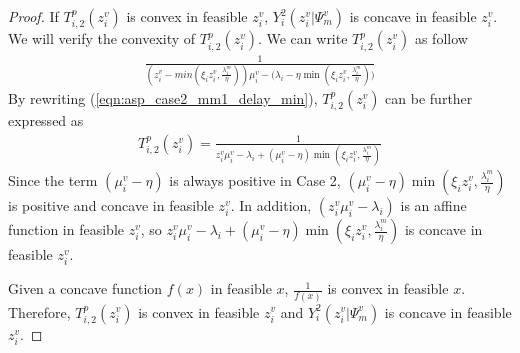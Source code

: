 \documentclass[conference]{IEEEtran}
\begin{document}
\begin{proof}
If $T_{i,2}^p(z_i^v)$ is convex in feasible $z_i^v$, $Y_i^2(z_i^v|\Psi_m^v)$ is concave in feasible $z_i^v$. We will verify the convexity of $T_{i,2}^p(z_i^v)$. We can write $T_{i,2}^p(z_i^v)$ as follow
\begin{equation} \label{eqn:asp_case2_mm1_delay_min}
\begin{aligned}
\frac{1}{(z_i^v-min(\xi_i z_i^v, \frac{\lambda_i^m}{\eta}))\mu_i^v - \big(\lambda_i - \eta\min(\xi_i z_i^v, \frac{\lambda_i^m}{\eta})\big)}
\end{aligned}
\end{equation}
By rewriting (\ref{eqn:asp_case2_mm1_delay_min}), $T_{i,2}^p(z_i^v)$ can be further expressed as
\begin{equation} \label{eqn:asp_case2_mm1_delay_min_new}
\begin{aligned}
T_{i,2}^p(z_i^v) = \frac{1}{z_i^v\mu_i^v - \lambda_i +(\mu_i^v - \eta)\min(\xi_i z_i^v, \frac{\lambda_i^m}{\eta})}
\end{aligned}
\end{equation}
Since the term $(\mu_i^v - \eta)$ is always positive in Case 2, $(\mu_i^v - \eta)\min(\xi_i z_i^v, \frac{\lambda_i^m}{\eta})$ is positive and concave in feasible $z_i^v$. In addition, $(z_i^v\mu_i^v - \lambda_i)$ is an affine function in feasible $z_i^v$, so $z_i^v\mu_i^v - \lambda_i+(\mu_i^v - \eta)\min(\xi_i z_i^v, \frac{\lambda_i^m}{\eta})$ is concave in feasible $z_i^v$\cite[Chapter~3.2]{boyd2004convex}.

Given a concave function $f(x)$ in feasible $x$, $\frac{1}{f(x)}$ is convex in feasible $x$. Therefore, $T_{i,2}^p(z_i^v)$ is convex in feasible $z_i^v$ and $Y_i^2(z_i^v|\Psi_m^v)$ is concave in feasible $z_i^v$.  \qedhere
\iffalse


\end{proof}
\end{document}
